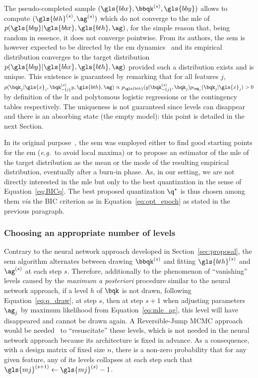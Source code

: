The pseudo-completed sample $(\gls{bbx}, \bbqk^{(s)}, \gls{bby})$ allows to compute $({\gls{bth}}^{(s)},{\ag}^{(s)})$ which do not converge to the \gls{mle} of $p(\gls{bby} | \gls{bbx}, \gls{bth}, \ag)$, for the simple reason that, being random in essence, it does not converge pointwise. From its authors, the \gls{sem} is however expected to be directed by the \gls{em} dynamics~\cite{celeux_sem} and its empirical distribution converges to the target distribution $p(\gls{bby} | \gls{bbx}, \gls{bth}, \ag)$ provided such a distribution exists and is unique. This existence is guaranteed by remarking that for all features $j$, $ p(\bqk_j | \gls{x}_j, \bqk^{(s)}_{-\{j\}} y, \gls{bth}, \ag) \propto p_{\gls{bth}}(y | \bqk^{(s)}_{-\{j\}}, \bqk_j) p_{\ag_j}(\bqk_j | \gls{x}_j) > 0 $ by definition of the \gls{lr} and polytomous logistic regressions or the contingency tables respectively. The uniqueness is not guaranteed since levels can disappear and there is an absorbing state (the empty model): this point is detailed in the next Section.

In its original purpose~\cite{celeux_sem}, the \gls{sem} was employed either to find good starting points for the \gls{em} (\textit{e.g.}\ to avoid local maxima) or to propose an estimator of the \gls{mle} of the target distribution as the mean or the mode of the resulting empirical distribution, eventually after a burn-in phase. As, in our setting, we are not directly interested in the \gls{mle} but only to the best quantization in the sense of Equation~\eqref{eq:BICq}. The best proposed quantization $\q^\star$ is thus chosen among them \textit{via} the BIC criterion as in Equation~\eqref{eq:opt_epoch} as stated in the previous paragraph.

\subsubsection{Choosing an appropriate number of levels} \label{par:choosing_sem}

Contrary to the neural network approach developed in Section~\ref{sec:proposal}, the \gls{sem} algorithm alternates between drawing $\bbqk^{(s)}$ and fitting ${\gls{bth}}^{(s)}$ and ${\ag}^{(s)}$  at each step $s$. Therefore, additionally to the phenomenon of ``vanishing'' levels caused by the \textit{maximum a posteriori} procedure similar to the neural network approach, if a level $h$ of $\bqk$ is not drawn, following Equation~\eqref{eq:q_draw}, at step $s$, then at step $s+1$ when adjusting parameters $\ag_j$ by maximum likelihood from Equation~\eqref{eq:mle_ag}, this level will have disappeared and cannot be drawn again. A Reversible-Jump MCMC approach would be needed~\cite{green1995reversible} to ``resuscitate'' these levels, which is not needed in the neural network approach because its architecture is fixed in advance. As a consequence, with a design matrix of fixed size $n$, there is a non-zero probability that for any given feature, any of its levels collapses at each step such that $\gls{mj}^{(s+1)} \leftarrow \gls{mj}^{(s)} - 1$.

